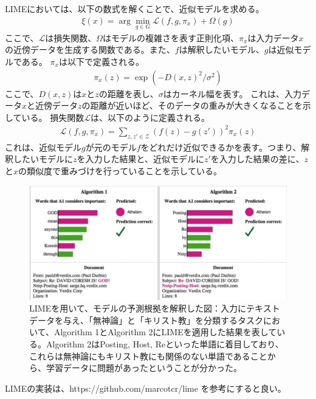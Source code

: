 \documentclass{ltjsarticle}
\begin{document}
\par
LIMEにおいては、以下の数式を解くことで、近似モデルを求める。
\begin{align}
  \xi(x) = \arg \min_{g \in G} \mathcal{L}(f, g, \pi_x) + \Omega(g)
\end{align}
ここで、$\mathcal{L}$は損失関数、$\Omega$はモデルの複雑さを表す正則化項、$\pi_x$は入力データ$x$の近傍データを生成する関数である。また、$f$は解釈したいモデル、$g$は近似モデルである。
$\pi_x$は以下で定義される。
\begin{align}
  \pi_x(z) = \exp \left( -D(x, z)^2 / \sigma^2 \right)
\end{align}
ここで、$D(x, z)$は$x$と$z$の距離を表し、$\sigma$はカーネル幅を表す。
これは、入力データ$x$と近傍データ$z$の距離が近いほど、そのデータの重みが大きくなることを示している。
損失関数$\mathcal{L}$は、以下のように定義される。
\begin{align}
  \mathcal{L}(f, g, \pi_x) = \sum_{z, z' \in \mathcal{Z}} \left( f(z) - g(z') \right)^2 \pi_x(z)
\end{align}
これは、近似モデル$g$が元のモデル$f$をどれだけ近似できるかを表す。つまり、解釈したいモデルに$z$を入力した結果と、近似モデルに$z'$を入力した結果の差に、$z$と$x$の類似度で重みづけを行っていることを示している。
\begin{figure}[htbp]
  \centering
  \includegraphics[width=14cm]{./capture/LIME_example.png}
  \caption{LIMEを用いて、モデルの予測根拠を解釈した図：入力にテキストデータを与え、「無神論」と「キリスト教」を分類するタスクにおいて、Algorithm 1とAlgorithm 2にLIMEを適用した結果を表している。Algorithm 2はPosting, Host, Reといった単語に着目しており、これらは無神論にもキリスト教にも関係のない単語であることから、学習データに問題があったということが分かった。}
  \label{fig:LIME_example}
\end{figure}
LIMEの実装は、https://github.com/marcotcr/lime を参考にすると良い。

\clearpage
\end{document}
